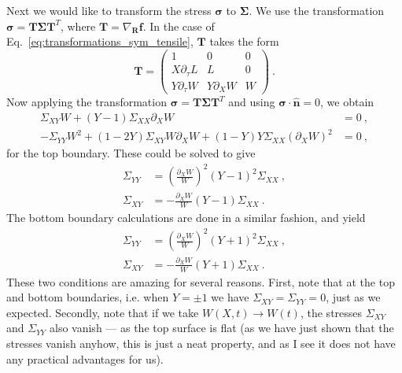\documentclass[12pt,a4paper]{article}
\begin{document}
Next we would like to transform the stress $\bm{\sigma}$ to $\bm{\Sigma}$. We use the transformation $\bm{\sigma}=\bm{T}\bm{\Sigma}\bm{T}^T$, where $\bm{T}=\nabla_{\bm{R}} \bm{f}$. In the case of Eq.~\eqref{eq:transformations_sym_tensile}, $\bm{T}$ takes the form
\begin{equation}\label{eq:T_sym_tensile}
  \bm{T} = \left(\begin{array}{ccc}
             1 & 0 & 0 \\
             X \partial_\tau L & L & 0 \\
             Y \partial_\tau W & Y \partial_X W & W
           \end{array}\right) \ .
\end{equation}
Now applying the transformation $\bm{\sigma}=\bm{T}\bm{\Sigma}\bm{T}^T$ and using $\bm{\sigma}\cdot\hat{\bm{n}} = 0$, we obtain
\begin{equation}\label{eq:free_bounds_sym_tensile}
  \begin{split}
     \Sigma_{XY} W + (Y-1) \Sigma_{XX}\partial_X W& = 0 \ , \\
     -\Sigma_{YY} W^2 + \left(1-2 Y\right)\Sigma_{XY} W \partial_X W + \left(1-Y\right)Y\Sigma_{XX}\left(\partial_X W\right)^2& = 0 \ ,
  \end{split}
\end{equation}
for the top boundary. These could be solved to give
\begin{equation}\label{eq:top_boundary_simple_1_sym_tensile}
  \begin{split}
     \Sigma_{YY} & = \left(\frac{\partial_X W}{W}\right)^2 \left(Y-1\right)^2 \Sigma_{XX} \ ,\\
     \Sigma_{XY} & = -\frac{\partial_X W}{W}\left(Y-1\right)\Sigma_{XX} \ .
  \end{split}
\end{equation}
The bottom boundary calculations are done in a similar fashion, and yield
\begin{equation}\label{eq:bottom_boundary_simple_sym_tensile}
  \begin{split}
     \Sigma_{YY} & = \left(\frac{\partial_X W}{W}\right)^2 \left(Y+1\right)^2 \Sigma_{XX} \ ,\\
     \Sigma_{XY} & = -\frac{\partial_X W}{W}\left(Y+1\right)\Sigma_{XX} \ .
  \end{split}
\end{equation}
These two conditions are amazing for several reasons. First, note that at the top and bottom boundaries, i.e. when $Y=\pm1$ we have $\Sigma_{XY}=\Sigma_{YY}=0$, just as we expected. Secondly, note that if we take $W\left(X,t\right)\rightarrow W\left(t\right)$, the stresses $\Sigma_{XY}$ and $\Sigma_{YY}$ also vanish --- as the top surface is flat (as we have just shown that the stresses vanish anyhow, this is just a neat property, and as I see it does not have any practical advantages for us).
\end{document}

